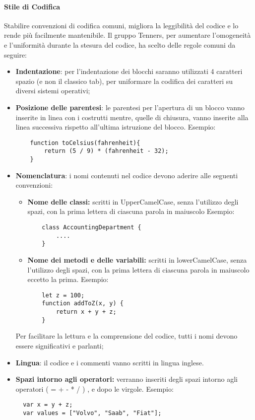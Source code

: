 \paragraph{Stile di Codifica}
Stabilire convenzioni di codifica comuni, migliora la leggibilità del codice e lo rende più facilmente mantenibile. Il gruppo Tenners, per aumentare l'omogeneità e l'uniformità durante la stesura del codice, ha scelto delle regole comuni da seguire:
\begin{itemize}
  \item \textbf{Indentazione}: per l'indentazione dei blocchi saranno utilizzati 4 caratteri spazio (e non il classico tab), per uniformare la codifica dei caratteri su diversi sistemi operativi;
  \item \textbf{Posizione delle parentesi}: le parentesi per l'apertura di un blocco vanno inserite in linea con i costrutti mentre, quelle di chiusura, vanno inserite alla linea successiva rispetto all'ultima istruzione del blocco.
  Esempio:
  \begin{lstlisting}
  	function toCelsius(fahrenheit){
  		return (5 / 9) * (fahrenheit - 32);
  	}
  \end{lstlisting}
  \item \textbf{Nomenclatura}: i nomi contenuti nel codice devono aderire alle seguenti convenzioni:
  \begin{itemize}
  	\item \textbf{Nome delle classi:} scritti in UpperCamelCase, senza l'utilizzo degli spazi, con la prima lettera di ciascuna parola in maiuscolo Esempio:
  	\begin{lstlisting}
  	class AccountingDepartment {
  		....
  	}
  	\end{lstlisting}
  	\item \textbf{Nome dei metodi e delle variabili:} scritti in lowerCamelCase, senza l'utilizzo degli spazi, con la prima lettera di ciascuna parola in maiuscolo eccetto la prima. Esempio:
  	\begin{lstlisting}
  	let z = 100;
  	function addToZ(x, y) {
  		return x + y + z;
  	}
  	\end{lstlisting}
  \end{itemize}
  Per facilitare la lettura e la comprensione del codice, tutti i nomi devono essere significativi e parlanti;
  \item \textbf{Lingua}: il codice e i commenti vanno scritti in lingua inglese.
  \item \textbf{Spazi intorno agli operatori:} verranno inseriti degli spazi intorno agli operatori ( = + - * / ) , e dopo le virgole. 
  Esempio:
  \begin{lstlisting}
  var x = y + z;
  var values = ["Volvo", "Saab", "Fiat"];
  \end{lstlisting}
  
\end{itemize}
